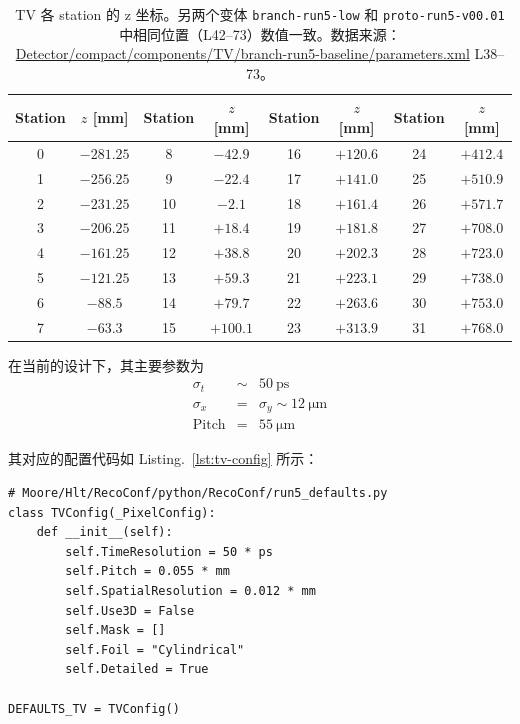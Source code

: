 \documentclass[UTF8]{article}
\begin{document}
\begin{table}[htbp]
  \centering
  \caption{TV 各 station 的 z 坐标。另两个变体 \texttt{branch-run5-low} 和 \texttt{proto-run5-v00.01} 中相同位置（L42--73）数值一致。数据来源：\protect\url{Detector/compact/components/TV/branch-run5-baseline/parameters.xml} L38--73。}
  \label{tab:tv-z}
  \begin{tabular}{cc|cc|cc|cc}
    \toprule
    Station & $z$ [mm] & Station & $z$ [mm] & Station & $z$ [mm] & Station & $z$ [mm] \\
    \midrule
     0 & $-281.25$ &  8 &  $-42.9$  & 16 & $+120.6$ & 24 & $+412.4$ \\
     1 & $-256.25$ &  9 &  $-22.4$  & 17 & $+141.0$ & 25 & $+510.9$ \\
     2 & $-231.25$ & 10 &   $-2.1$  & 18 & $+161.4$ & 26 & $+571.7$ \\
     3 & $-206.25$ & 11 &  $+18.4$  & 19 & $+181.8$ & 27 & $+708.0$ \\
     4 & $-161.25$ & 12 &  $+38.8$  & 20 & $+202.3$ & 28 & $+723.0$ \\
     5 & $-121.25$ & 13 &  $+59.3$  & 21 & $+223.1$ & 29 & $+738.0$ \\
     6 &  $-88.5$  & 14 &  $+79.7$  & 22 & $+263.6$ & 30 & $+753.0$ \\
     7 &  $-63.3$  & 15 & $+100.1$  & 23 & $+313.9$ & 31 & $+768.0$ \\
    \bottomrule
  \end{tabular}
\end{table}

\newpage

在当前的设计下，其主要参数为
\begin{eqnarray}
\sigma_{t} &\sim& 50~\mathrm{ps}\\
\sigma_{x} &=& \sigma_{y} \sim 12~\mathrm{\mu m}\\
\mathrm{Pitch} &=& 55~\mathrm{\mu m}
\end{eqnarray}

其对应的配置代码如 Listing.~\ref{lst:tv-config} 所示：
\begin{lstlisting}[style=python, label=lst:tv-config, caption={TV 探测器配置代码（TVConfig）}]
# Moore/Hlt/RecoConf/python/RecoConf/run5_defaults.py
class TVConfig(_PixelConfig):
    def __init__(self):
        self.TimeResolution = 50 * ps
        self.Pitch = 0.055 * mm
        self.SpatialResolution = 0.012 * mm
        self.Use3D = False
        self.Mask = []
        self.Foil = "Cylindrical"
        self.Detailed = True

DEFAULTS_TV = TVConfig()
\end{lstlisting}
\end{document}
